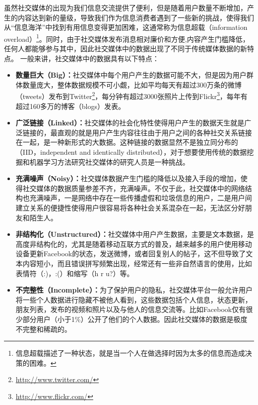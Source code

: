 虽然社交媒体的出现为我们信息交流提供了便利，但是随着用户数量不断增加，产生的内容达到新的量级，导致我们作为信息消费者遇到了一些新的挑战，使得我们从“信息海洋”中找到有用信息变得更加困难，这通常称为信息超载（information overload）\footnote{信息超载描述了一种状态，就是当一个人在做选择时因为太多的信息而造成决策的困难。}。同时，由于社交媒体发布消息相对廉价和方便,内容产生门槛降低，任何人都能够参与其中，因此社交媒体中的数据出现了不同于传统媒体数据的新特点。
一般来讲，社交媒体中的数据具有以下特点：
\begin{itemize}
\item \textbf{数量巨大（Big）：}社交媒体中每个用户产生的数据可能不大，但是因为用户群体数量庞大，整体数据规模不可小觑，比如平均每天有超过300万条的微博（tweets）发布到Twitter\footnote{\url{http://www.twitter.com/}}，每分钟有超过3000张照片上传到Flickr\footnote{\url{http://www.flickr.com/}}，每年有超过160多万的博客（blogs）发表。
\item \textbf{广泛链接（Linked）：}社交媒体的社会化特性使得用户产生的数据天生就是广泛链接的，最直观的就是用户产生内容往往由于用户之间的各种社交关系链接在一起，是一种新形式的大数据。这种链接的数据显然不是独立同分布的（IID，independent and identically distributed），对于想要使用传统的数据挖掘和机器学习方法研究社交媒体的研究人员是一种挑战。
\item \textbf{充满噪声（Noisy）：}社交媒体数据产生门槛的降低以及接入手段的增加，使得社交媒体的数据质量参差不齐，充满噪声。不仅于此，社交媒体中的网络结构也充满噪声，一是网络中存在一些传播虚假和垃圾信息的用户，二是用户间建立关系的便捷性使得用户很容易将各种社会关系混杂在一起，无法区分好朋友和陌生人。
\item \textbf{非结构化（Unstructured）：}社交媒体中用户产生数据，主要是文本数据，是高度非结构化的，尤其是随着移动互联方式的普及，越来越多的用户使用移动设备更新Facebook的状态，发送微博，或者回复别人的帖子，这不但导致了文本内容短小，而且错误拼写频繁出现，经常还有一些非自然语言的使用，比如表情符（:)，:(）和缩写（h r u?）等。
\item \textbf{不完整性（Incomplete）：}为了保护用户的隐私，社交媒体平台一般允许用户将一些个人数据进行隐藏不被他人看到，这些数据包括个人信息，状态更新，朋友列表，发布的视频和照片以及与他人的信息交流等。比如Facebook仅有很少部分用户（小于1\%）公开了他们的个人数据。因此社交媒体的数据是极度不完整和稀疏的。
\end{itemize}

